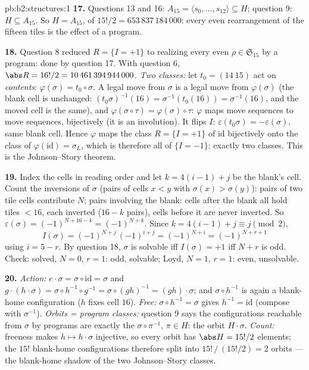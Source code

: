 \begin{solution}{pb:b2:structures:1}
\textbf{17.} Questions 13 and 16: $A_{15} = \langle s_0, \dots,
s_{12}\rangle \subseteq H$; question 9: $H \subseteq A_{15}$. So
$H = A_{15}$, of  $15!/2 = 653\,837\,184\,000$: every even
rearrangement of the fifteen tiles is the effect of a program.

\textbf{18.} Question 8 reduced $R = \{I = +1\}$ to realizing
every even $\rho \in \mathfrak{S}_{15}$ by a program: done by
question 17. With question 6, $\abs R = 16!/2 =
10\,461\,394\,944\,000$. \emph{Two classes:} let $t_0 = (14\
15)$ act on \emph{contents}: $\varphi(\sigma) = t_0 \circ
\sigma$. A legal move from $\sigma$ is a legal move from
$\varphi(\sigma)$ (the blank cell is unchanged:
$(t_0\sigma)^{-1}(16) = \sigma^{-1}(t_0(16)) = \sigma^{-1}(16)$,
and the moved cell is the same), and $\varphi(\sigma \circ \tau)
= \varphi(\sigma) \circ \tau$: $\varphi$ maps move sequences to
move sequences, bijectively (it is an involution). It flips $I$:
$\varepsilon(t_0\sigma) = -\varepsilon(\sigma)$, same blank
cell. Hence $\varphi$ maps the class $R = \{I = +1\}$ of
$\mathrm{id}$ bijectively onto the class of $\varphi(\mathrm{id})
= \sigma_L$, which is therefore all of $\{I = -1\}$: exactly two
classes. This is the Johnson--Story theorem.

\textbf{19.} Index the cells in reading order and let $k = 4(i -
1) + j$ be the blank's cell. Count the inversions of $\sigma$
(pairs of cells $x < y$ with $\sigma(x) > \sigma(y)$): pairs of
two tile cells contribute $N$; pairs involving the blank: cells
after the blank all hold tiles $< 16$, each inverted ($16 - k$
pairs), cells before it are never inverted. So
$\varepsilon(\sigma) = (-1)^{N + 16 - k} = (-1)^{N + k}$. Since
$k = 4(i-1) + j \equiv j \pmod 2$,
\[
I(\sigma) = (-1)^{N + j}\,(-1)^{i + j} = (-1)^{N + i}
= (-1)^{N + r + 1}
\]
using $i = 5 - r$. By question 18, $\sigma$ is solvable iff
$I(\sigma) = +1$ iff $N + r$ is odd. Check: solved, $N = 0$, $r
= 1$: odd, solvable; Loyd, $N = 1$, $r = 1$: even, unsolvable.

\textbf{20.} \emph{Action:} $e \cdot \sigma = \sigma \circ
\mathrm{id} = \sigma$ and $g \cdot (h \cdot \sigma) = \sigma
\circ h^{-1} \circ g^{-1} = \sigma \circ (gh)^{-1} = (gh) \cdot
\sigma$; and $\sigma \circ h^{-1}$ is again a blank-home
configuration ($h$ fixes cell $16$). \emph{Free:} $\sigma \circ
h^{-1} = \sigma$ gives $h^{-1} = \mathrm{id}$ (compose with
$\sigma^{-1}$). \emph{Orbits = program classes:} question 9
says the configurations reachable from $\sigma$ by programs are
exactly the $\sigma \circ \pi^{-1}$, $\pi \in H$: the orbit $H
\cdot \sigma$. \emph{Count:} freeness makes $h \mapsto h \cdot
\sigma$ injective, so every orbit has $\abs H = 15!/2$ elements;
the $15!$ blank-home configurations therefore split into
$15!\,/\,(15!/2) = 2$ orbits --- the blank-home shadow of the
two Johnson--Story classes.


\end{solution}
